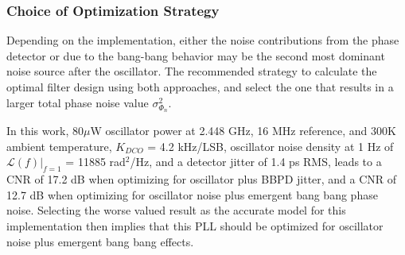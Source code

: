 	\subsubsection{Choice of Optimization Strategy}
	Depending on the implementation, either the noise contributions from the phase detector or due to the bang-bang behavior may be the second most dominant noise source after the oscillator. The recommended strategy to calculate the optimal filter design using both approaches, and select the one that results in a larger total phase noise value $\sigma_{\Phi_{n}}^2$.

	In this work, 80$\mu$W oscillator power at 2.448 GHz, 16 MHz reference, and 300K ambient temperature, $K_{DCO}$ = 4.2 kHz/LSB, oscillator noise density at 1 Hz of $\mathcal{L}(f)|_{f=1}$ = 11885 rad$^2$/Hz, and a detector jitter of 1.4 ps RMS, leads to a CNR of 17.2 dB when optimizing for oscillator plus BBPD jitter, and a CNR of 12.7 dB when optimizing for oscillator noise plus emergent bang bang phase noise. Selecting the worse valued result as the accurate model for this implementation then implies that this PLL should be optimized for oscillator noise plus emergent bang bang effects. 




	\FloatBarrier

